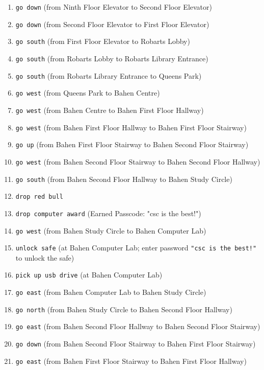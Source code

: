 \documentclass[11pt]{article}
\begin{document}
\begin{enumerate}
    \item \texttt{go down} \quad (from Ninth Floor Elevator to Second Floor Elevator)
    \item \texttt{go down} \quad (from Second Floor Elevator to First Floor Elevator)
    \item \texttt{go south} \quad (from First Floor Elevator to Robarts Lobby)
    \item \texttt{go south} \quad (from Robarts Lobby to Robarts Library Entrance)
    \item \texttt{go south} \quad (from Robarts Library Entrance to Queens Park)
    \item \texttt{go west} \quad (from Queens Park to Bahen Centre)
    \item \texttt{go west} \quad (from Bahen Centre to Bahen First Floor Hallway)
    \item \texttt{go west} \quad (from Bahen First Floor Hallway to Bahen First Floor Stairway)
    \item \texttt{go up} \quad (from Bahen First Floor Stairway to Bahen Second Floor Stairway)
    \item \texttt{go west} \quad (from Bahen Second Floor Stairway to Bahen Second Floor Hallway)
    \item \texttt{go south} \quad (from Bahen Second Floor Hallway to Bahen Study Circle)
    \item \texttt{drop red bull}
    \item \texttt{drop computer award} \quad (Earned Passcode: "csc is the best!")
    \item \texttt{go west} \quad (from Bahen Study Circle to Bahen Computer Lab)
    \item \texttt{unlock safe} \quad (at Bahen Computer Lab; enter password \texttt{"csc is the best!"} to unlock the safe)
    \item \texttt{pick up usb drive} \quad (at Bahen Computer Lab)
    \item \texttt{go east} \quad (from Bahen Computer Lab to Bahen Study Circle)
    \item \texttt{go north} \quad (from Bahen Study Circle to Bahen Second Floor Hallway)
    \item \texttt{go east} \quad (from Bahen Second Floor Hallway to Bahen Second Floor Stairway)
    \item \texttt{go down} \quad (from Bahen Second Floor Stairway to Bahen First Floor Stairway)
    \item \texttt{go east} \quad (from Bahen First Floor Stairway to Bahen First Floor Hallway)

\end{enumerate}
\end{document}
